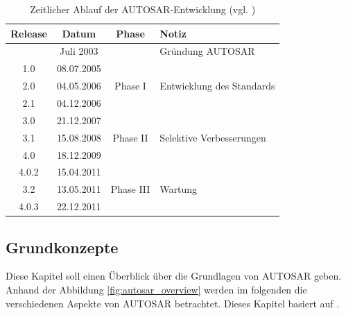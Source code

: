 \documentclass[
  a4paper,					    %
  twoside,
  DIV=calc,     				%
  bibliography=totoc,
  cleardoublepage=empty,
  ngerman,     					%
  final       					%
]{scrbook}
\begin{document}
\begin{table}[h]
\center
\begin{tabular}[h]{c c c l}
\toprule
Release & Datum & Phase & Notiz\\
\midrule
      & Juli 2003  &  & Gründung AUTOSAR\\
\midrule
1.0   & 08.07.2005 & \multirow{3}{*}{Phase I} & \\
2.0	  & 04.05.2006 &  & Entwicklung des Standards\\
2.1	  & 04.12.2006 &  & \\
\midrule
3.0	  & 21.12.2007 & \multirow{3}{*}{Phase II} & \\
3.1	  & 15.08.2008 &  & Selektive Verbesserungen\\
4.0	  & 18.12.2009 &  & \\
\midrule
4.0.2 & 15.04.2011 & \multirow{3}{*}{Phase III} & \\
3.2	  & 13.05.2011 &  & Wartung\\
4.0.3 & 22.12.2011 &  & \\
\bottomrule
\end{tabular}
\caption{Zeitlicher Ablauf der AUTOSAR-Entwicklung (vgl. \cite{wiki:autosar_de}\cite{as_roadmap}\cite{as_background})}
\label{tab:timeline}
\end{table}








\subsection{Grundkonzepte}
\label{sec:Grundkonzepte}
Diese Kapitel soll einen Überblick über die Grundlagen von AUTOSAR geben. Anhand der Abbildung \ref{fig:autosar_overview} werden im folgenden die verschiedenen Aspekte von AUTOSAR betrachtet. Dieses Kapitel basiert auf \cite{autosar_techoverview}.
\end{document}
